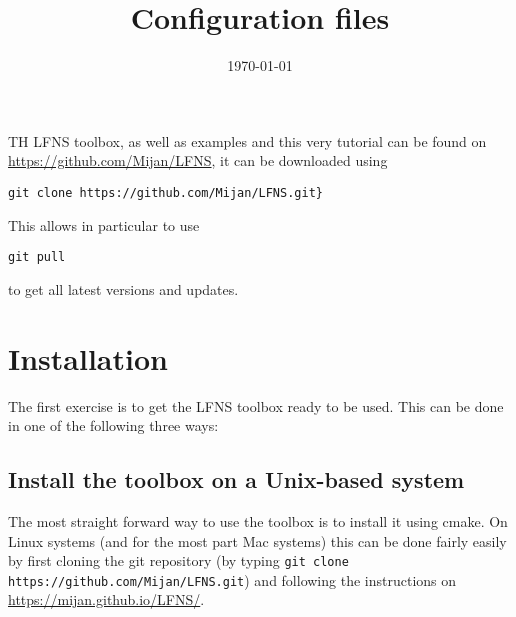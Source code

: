 \documentclass[11pt]{article} %
\title{Configuration files}
\date{\today} %
\begin{document}
TH LFNS toolbox, as well as examples and this very tutorial can be found on \url{https://github.com/Mijan/LFNS}, it can be downloaded using 

\begin{tcolorbox}
\begin{verbatim}
git clone https://github.com/Mijan/LFNS.git}
\end{verbatim}
\end{tcolorbox}

This allows in particular to use

\begin{tcolorbox}
\begin{verbatim}
git pull
\end{verbatim}
\end{tcolorbox}
 to get all latest versions and updates. 
\section{Installation}
The first exercise is to get the LFNS toolbox ready to be used. This can be done in one of the following three ways: 
\subsection{Install the toolbox on a Unix-based system}
The most straight forward way to use the toolbox is to install it using cmake. On Linux systems (and for the most part Mac systems) this can be done fairly easily by first cloning the git repository (by typing \texttt{git clone https://github.com/Mijan/LFNS.git}) and following the instructions on \href{https://mijan.github.io/LFNS/}{https://mijan.github.io/LFNS/}. 
\end{document}
